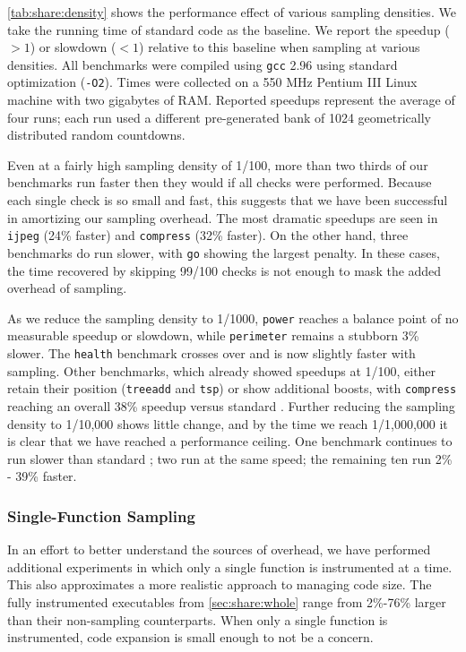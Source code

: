 \autoref{tab:share:density} shows the performance effect of various
sampling densities.  We take the running time of standard \CCured code
as the baseline.  We report the speedup ($>1$) or slowdown ($<1$)
relative to this baseline when sampling at various densities.  All
benchmarks were compiled using \texttt{gcc} 2.96 using standard
optimization (\texttt{-O2}).  Times were collected on a 550 MHz
Pentium III Linux machine with two gigabytes of RAM\@.  Reported
speedups represent the average of four runs; each run used a different
pre-generated bank of 1024 geometrically distributed random
countdowns.

Even at a fairly high sampling density of 1/100, more than two thirds
of our benchmarks run faster then they would if all checks were
performed.  Because each single check is so small and fast, this
suggests that we have been successful in amortizing our sampling
overhead.  The most dramatic speedups are seen in \texttt{ijpeg} (24\%
faster) and \texttt{compress} (32\% faster).  On the other hand, three
benchmarks do run slower, with \texttt{go} showing the largest
penalty.  In these cases, the time recovered by skipping 99/100 checks
is not enough to mask the added overhead of sampling.

As we reduce the sampling density to 1/1000, \texttt{power} reaches a
balance point of no measurable speedup or slowdown, while
\texttt{perimeter} remains a stubborn 3\% slower.  The \texttt{health}
benchmark crosses over and is now slightly faster with sampling.
Other benchmarks, which already showed speedups at 1/100, either
retain their position (\texttt{treeadd} and \texttt{tsp}) or show
additional boosts, with \texttt{compress} reaching an overall 38\%
speedup versus standard \CCured.  Further reducing the sampling
density to 1/10,000 shows little change, and by the time we reach
1/1,000,000 it is clear that we have reached a performance ceiling.
One benchmark continues to run slower than standard \CCured; two run
at the same speed; the remaining ten run 2\% - 39\% faster.

\subsubsection{Single-Function Sampling}

In an effort to better understand the sources of overhead, we have
performed additional experiments in which only a single function is
instrumented at a time.  This also approximates a more realistic
approach to managing code size.  The fully instrumented executables
from \autoref{sec:share:whole} range from 2\%-76\% larger than their
non-sampling counterparts.  When only a single function is
instrumented, code expansion is small enough to not be a concern.

